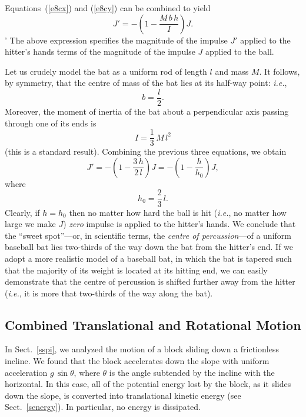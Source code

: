 Equations~(\ref{e8cx}) and (\ref{e8cy}) can be combined to yield
\begin{equation}
J' = -\left(1 - \frac{M\,b\,h}{I}\right) J.
\end{equation}'
The above expression specifies the magnitude of the impulse $J'$ applied to
the hitter's hands terms of the magnitude of the impulse $J$ applied to the ball.

Let us crudely model the bat as a uniform rod of length $l$ and
mass $M$. It follows, by symmetry, that the centre of mass of the bat
lies at its half-way point: {\em i.e.}, 
\begin{equation}
b = \frac{l}{2}.
\end{equation}
Moreover, the moment of inertia of the bat about a perpendicular axis passing
through one of its ends is
\begin{equation}
I = \frac{1}{3}\,M\,l^2
\end{equation}
(this is a standard result). 
Combining the previous three equations, we obtain 
\begin{equation}
J' = -\left(1 - \frac{3\,h}{2\,l}\right) J=-\left(1 - \frac{h}{h_0}\right) J,
\end{equation}
where 
\begin{equation}
h_0 = \frac{2}{3}\,l.
\end{equation}
Clearly, if $h=h_0$ then no matter how hard the ball is hit ({\em i.e.}, no matter how
large we make $J$) {\em zero} impulse is applied to the hitter's hands. 
We conclude that the ``sweet spot''---or, in scientific terms, the {\em centre of percussion}---of
a uniform baseball bat lies two-thirds of the way down the bat from the hitter's end. If we
adopt a more realistic model of a baseball bat, in which the bat is tapered such that the
majority of its weight is located at its hitting end, we can easily demonstrate that the
centre of percussion is shifted further away from the hitter ({\em i.e.}, it is
more that two-thirds of the way along the bat).

\subsection{Combined Translational and Rotational Motion}\label{sroll}
In Sect.~\ref{sspi}, we analyzed the motion of a block sliding down a
frictionless incline. We found that the block accelerates down the
slope with uniform acceleration $g\,\sin\theta$, where $\theta$ is
the angle subtended by the incline with the horizontal. In this case,
all of the potential energy lost by the block, as it slides down
the slope, is converted into translational kinetic energy (see
Sect.~\ref{senergy}). In particular, no energy
is dissipated.

